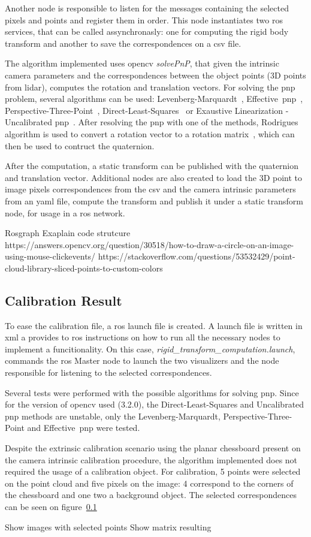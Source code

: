 Another node is responsible to listen for the messages containing the selected pixels and points and register them in order. This node instantiates two \ac{ros} services, that can be called assynchronasly: one for computing the rigid body transform and another to save the correspondences on a \ac{csv} file. 

The algorithm implemented uses \ac{opencv} \emph{solvePnP}, that given the intrinsic camera parameters and the correspondences between the object points (3D points from \ac{lidar}), computes the rotation and translation vectors. For solving the \ac{pnp} problem, several algorithms can be used: Levenberg-Marquardt~\cite{Levenberg1943}, Effective~\ac{pnp}~\cite{Lepetit2009}, Perspective-Three-Point~\cite{Gao2003}, Direct-Least-Squares~\cite{Hesch2011} or Exaustive Linearization - Uncalibrated \ac{pnp}~\cite{Penate-Sanchez2013a}. After resolving the \ac{pnp} with one of the methods, Rodrigues algorithm is used to convert a rotation vector to a rotation matrix~\cite{Dai2015}, which can then be used to contruct the quaternion.

After the computation, a static transform can be published with the quaternion and translation vector. Additional nodes are also created to load the 3D point to image pixels correspondences from the \ac{csv} and the camera intrinsic parameters from an \ac{yaml} file, compute the transform and publish it under a static transform node, for usage in a \ac{ros} network.


Rosgraph
Exaplain code strutcure
https://answers.opencv.org/question/30518/how-to-draw-a-circle-on-an-image-using-mouse-clickevents/
https://stackoverflow.com/questions/53532429/point-cloud-library-sliced-points-to-custom-colors

\subsection{Calibration Result}
To ease the calibration file, a \ac{ros} launch file is created. A launch file is written in \ac{xml} a provides to \ac{ros} instructions on how to run all the necessary nodes to implement a funcitionality. On this case, \emph{rigid\_transform\_computation.launch}, commands the \ac{ros} Master node to launch the two visualizers and the node responsible for listening to the selected correspondences. 

Several tests were performed with the possible algorithms for solving \ac{pnp}. Since for the version of \ac{opencv} used (3.2.0), the Direct-Least-Squares and Uncalibrated \ac{pnp} methods are unstable, only the Levenberg-Marquardt, Perspective-Three-Point and Effective~\ac{pnp} were tested. 

Despite the extrinsic calibration scenario using the planar chessboard present on the camera intrinsic calibration procedure, the algorithm implemented does not required the usage of a calibration object. For calibration, 5 points were selected on the point cloud and five pixels on the image: 4 correspond to the corners of the chessboard and one two a background object. The selected correspondences can be seen on figure~\ref{}


Show images with selected points
Show matrix resulting
